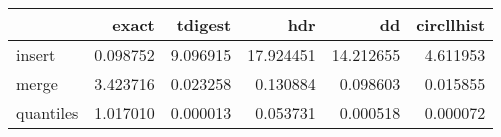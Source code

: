 \begin{tabular}{lrrrrr}
\toprule
{} &     exact &   tdigest &        hdr &         dd &  circllhist \\
\midrule
insert    &  0.098752 &  9.096915 &  17.924451 &  14.212655 &    4.611953 \\
merge     &  3.423716 &  0.023258 &   0.130884 &   0.098603 &    0.015855 \\
quantiles &  1.017010 &  0.000013 &   0.053731 &   0.000518 &    0.000072 \\
\bottomrule
\end{tabular}
